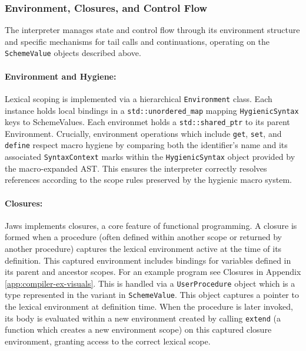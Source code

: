 \documentclass[final]{cmpreport_02}
\begin{document}
\subsubsection{Environment, Closures, and Control Flow}

The interpreter manages state and control flow through its environment structure and specific mechanisms for tail calls and continuations, operating on the \texttt{SchemeValue} objects described above.

\paragraph{Environment and Hygiene:}Lexical scoping is implemented via a hierarchical \linebreak\texttt{Environment} class. Each instance holds local bindings in a \texttt{std::unordered\_map} mapping \texttt{HygienicSyntax} keys to SchemeValues. Each environmet holds a \linebreak\texttt{std::shared\_ptr} to its parent Environment. Crucially, environment operations which include \texttt{get}, \texttt{set}, and \texttt{define} respect macro hygiene by comparing both the identifier's name and its associated \texttt{SyntaxContext} marks within the \linebreak\texttt{HygienicSyntax} object provided by the macro-expanded AST. This ensures the interpreter correctly resolves references according to the scope rules preserved by the hygienic macro system.

\paragraph{Closures:}Jaws implements closures, a core feature of functional programming. A closure is formed when a procedure (often defined within another scope or returned by another procedure) captures the lexical environment active at the time of its definition. This captured environment includes bindings for variables defined in its parent and ancestor scopes. For an example program see Closures in Appendix \ref{app:compiler-ex-visuals}. This is handled via a \texttt{UserProcedure} object which is a type represented in the variant in \linebreak\texttt{SchemeValue}. This object captures a pointer to the lexical environment at definition time. When the procedure is later invoked, its body is evaluated within a new environment created by calling \texttt{extend} (a function which creates a new environment scope) on this captured closure environment, granting access to the correct lexical scope.
\end{document}
